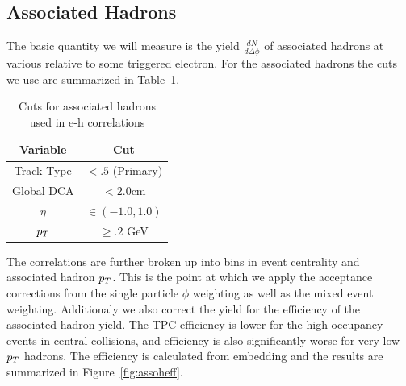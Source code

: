 \subsection{Associated Hadrons}

The basic quantity we will measure is the yield $\frac{dN}{d\Delta\phi}$ of associated hadrons at various relative to some triggered electron. For the associated hadrons the cuts we use are summarized in Table~\ref{tab:assohcuts}.

\begin{table}
\centering
\begin{tabular}{|c|c|}
\hline
Variable			& Cut \\
\hline
Track Type          & $< .5$ (Primary) \\
\hline
Global DCA          & $< 2.0$cm \\
\hline
$\eta$              & $\in(-1.0, 1.0)$ \\
\hline
$p_{T}$               & $\geq .2$ GeV \\
\hline
\end{tabular}
\caption[Associated hadron cuts]{Cuts for associated hadrons used in e-h correlations}
\label{tab:assohcuts}
\end{table} 

The correlations are further broken up into bins in event centrality and associated hadron $p_{T}$. This is the point at which we apply the acceptance corrections from the single particle $\phi$ weighting as well as the mixed event weighting. Additionaly we also correct the yield for the efficiency of the associated hadron yield. The TPC efficiency is lower for the high occupancy events in central collisions, and efficiency is also significantly worse for very low $p_{T}$ hadrons. The efficiency is calculated from embedding and the results are summarized in Figure~\ref{fig:assoheff}.

